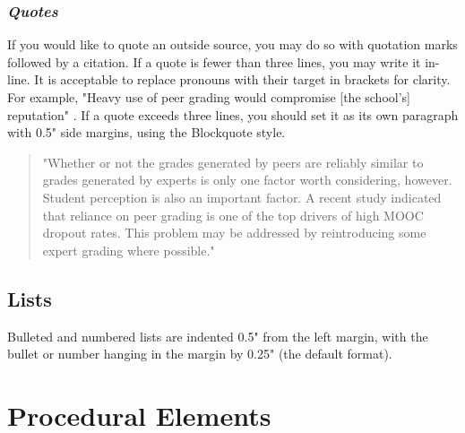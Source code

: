 \documentclass[11pt,a4paper,usenames,dvipsnames]{article}
\begin{document}
\subsubsection{\textit{Quotes}}
If you would like to quote an outside source, you may do so with quotation marks followed by a citation. If a quote is fewer than three lines, you may write it in-line. It is acceptable to replace pronouns with their target in brackets for clarity. For example, "Heavy use of peer grading would compromise [the school’s] reputation" \parencite{joyner2016}. If a quote exceeds three lines, you should set it as its own paragraph with 0.5" side margins, using the Blockquote style.
\begin{quote}
"Whether or not the grades generated by peers are reliably similar to grades generated by experts is only one factor worth considering, however. Student perception is also an important factor. A recent study indicated that reliance on peer grading is one of the top drivers of high MOOC dropout rates. This problem may be addressed by reintroducing some expert grading where possible." \parencite{joyner2016}

\end{quote}

\subsection{Lists}
Bulleted and numbered lists are indented 0.5" from the left margin, with the bullet or number hanging in the margin by 0.25" (the default format).

\section{Procedural Elements}
\end{document}
